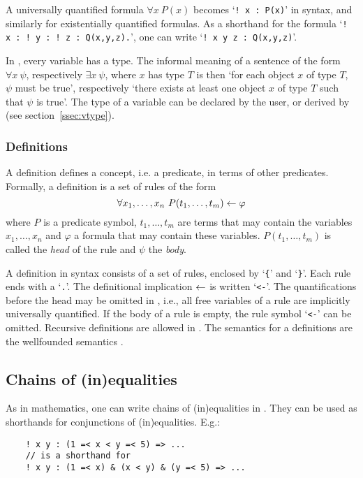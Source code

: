 \documentclass[a4]{article}
\begin{document}
A universally quantified formula $\forall x\ P(x)$ becomes `{\tt !\,x\,:\,P(x)}' in \idp syntax, and similarly for existentially quantified formulas. As a shorthand for the formula `{\tt !\,x\,:\,!\,y\,:\,!\,z\,:\,Q(x,y,z).}', one can write `{\tt !\,x y z\,:\,Q(x,y,z)}'. 



In \idp, every variable has a type. The informal meaning of a sentence of the form $\forall x\ \psi$, respectively $\exists x\ \psi$, where $x$ has type $T$ is then `for each object $x$ of type $T$, $\psi$ must be true', respectively `there exists at least one object $x$ of type $T$ such that $\psi$ is true'. The type of a variable can be declared by the user, or derived by \idp (see section~\ref{ssec:vtype}).


\subsubsection{Definitions}
A definition defines a concept, i.e. a predicate, in terms of other predicates. Formally, a definition is a set of rules of the form 
\[ \forall x_1,\ldots,x_n\ P(t_1,\ldots,t_m) \leftarrow \varphi \]
where $P$ is a predicate symbol, $t_1,\ldots,t_m$ are terms that may contain the variables $x_1,\ldots,x_n$ and $\varphi$ a formula that may contain these variables. $P(t_1,\ldots,t_m)$ is called the \emph{head} of the rule and $\psi$ the \emph{body}. 

A definition in \idp syntax consists of a set of rules, enclosed by `{\tt \{}' and `{\tt \}}'. Each rule ends with a `{\tt .}'. The definitional implication $\leftarrow$ is written `{\tt <-}'. The quantifications before the head may be omitted in \idp, i.e., all free variables of a rule are implicitly universally quantified. If the body of a rule is empty, the rule symbol `{\tt <-}' can be omitted. Recursive definitions are allowed in \idp. The semantics for a definitions are the wellfounded semantics .





\subsection{Chains of (in)equalities}
As in mathematics, one can write chains of (in)equalities in \idp. They can be used as shorthands for conjunctions of (in)equalities. E.g.:
\begin{lstlisting}
	! x y : (1 =< x < y =< 5) => ...
	// is a shorthand for
	! x y : (1 =< x) & (x < y) & (y =< 5) => ...
\end{lstlisting}
\end{document}
